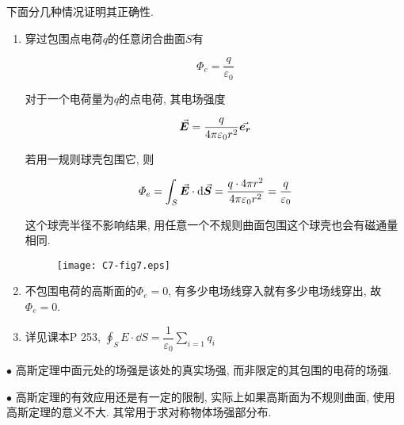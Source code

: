 下面分几种情况证明其正确性. 

\begin{enumerate}
	\item 穿过包围点电荷$q$的任意闭合曲面$S$有
	
	\begin{equation}
		\varPhi_e = \dfrac{q}{\varepsilon_0} \label{C7-eq5}
	\end{equation}
	
	对于一个电荷量为$q$的点电荷, 其电场强度
	
	\begin{equation}
		\va*{E} = \dfrac{q}{4 \pi \varepsilon_0 r^2}\va*{e_r} \label{C7-eq6}
	\end{equation}
	
	若用一规则球壳包围它, 则
	
	\begin{equation}
		\varPhi_e = \int_{S}{\va*{E} \cdot \dd{\va*{S}}} = \dfrac{q \cdot 4 \pi r^2}{4 \pi \varepsilon_0 r^2} = \dfrac{q}{\varepsilon_0} \label{C7-eq7}
	\end{equation}
	
	这个球壳半径不影响结果, 用任意一个不规则曲面包围这个球壳也会有磁通量相同.
	
	\begin{figure}[h]
		\centering
		\texttt{[image: C7-fig7.eps]}
	\end{figure}
	
	\item 不包围电荷的高斯面的$\varPhi_e = 0$, 有多少电场线穿入就有多少电场线穿出, 故$\varPhi_e = 0$. 
	
	\vskip 0.3cm
	
	\item 详见课本P 253, $\displaystyle \oint_S E \cdot \dd{S} = \dfrac{1}{\varepsilon_0} \sum\limits_{i = 1} q_i$
	
\end{enumerate}

\begin{note}
	
	$\bullet$ 高斯定理中面元处的场强是该处的真实场强, 而非限定的其包围的电荷的场强. 
	
	$\bullet$ 高斯定理的有效应用还是有一定的限制, 实际上如果高斯面为不规则曲面, 使用高斯定理的意义不大. 其常用于求对称物体场强部分布. 
	
\end{note}

\newpage 

